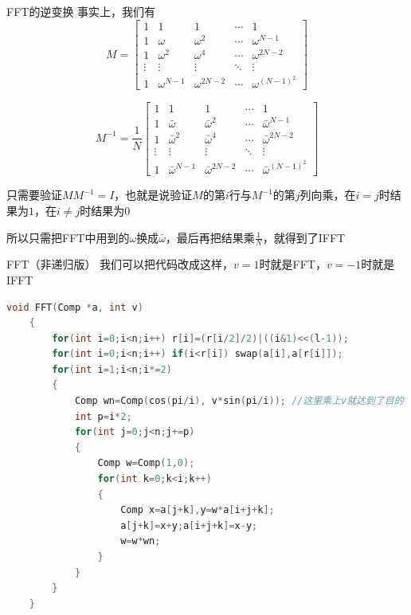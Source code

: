 \documentclass{beamer}
\begin{document}
\begin{frame}{FFT的逆变换}
    \small
    事实上，我们有
    \begin{equation*}
        M=\begin{bmatrix}
            1 & 1 & 1 & \cdots & 1\\
            1 & \omega & \omega^2 & \cdots & \omega^{N-1}\\
            1 & \omega^2 & \omega^4 & \cdots & \omega^{2N-2}\\
            \vdots & \vdots & \vdots & \ddots & \vdots \\
            1 & \omega^{N-1} & \omega^{2N-2} & \cdots & \omega^{(N-1)^2}
        \end{bmatrix}
    \end{equation*}

    \begin{equation*}
        M^{-1}=\frac{1}{N}\begin{bmatrix}
            1 & 1 & 1 & \cdots & 1\\
            1 & \bar\omega & \bar\omega^2 & \cdots & \bar\omega^{N-1}\\
            1 & \bar\omega^2 & \bar\omega^4 & \cdots & \bar\omega^{2N-2}\\
            \vdots & \vdots & \vdots & \ddots & \vdots \\
            1 & \bar\omega^{N-1} & \bar\omega^{2N-2} & \cdots & \bar\omega^{(N-1)^2}
        \end{bmatrix}
    \end{equation*}

    只需要验证$MM^{-1}=I$，也就是说验证$M$的第$i$行与$M^{-1}$的第$j$列向乘，在$i=j$时结果为$1$，在$i\neq j$时结果为$0$

    所以只需把FFT中用到的$\omega$换成$\bar \omega$，最后再把结果乘$\frac{1}{N}$，就得到了IFFT
\end{frame}

\begin{frame}[fragile]{FFT（非递归版）}
    \small
    我们可以把代码改成这样，$v=1$时就是FFT，$v=-1$时就是IFFT

    \begin{lstlisting}[language=c++]
    void FFT(Comp *a, int v)
    {
        for(int i=0;i<n;i++) r[i]=(r[i/2]/2)|((i&1)<<(l-1));
        for(int i=0;i<n;i++) if(i<r[i]) swap(a[i],a[r[i]]);
        for(int i=1;i<n;i*=2)
        {
            Comp wn=Comp(cos(pi/i), v*sin(pi/i)); //这里乘上v就达到了目的
            int p=i*2;
            for(int j=0;j<n;j+=p)
            {
                Comp w=Comp(1,0);
                for(int k=0;k<i;k++)
                {
                    Comp x=a[j+k],y=w*a[i+j+k];
                    a[j+k]=x+y;a[i+j+k]=x-y;
                    w=w*wn;
                }
            }
        }
    }
    \end{lstlisting}
\end{frame}
\end{document}
